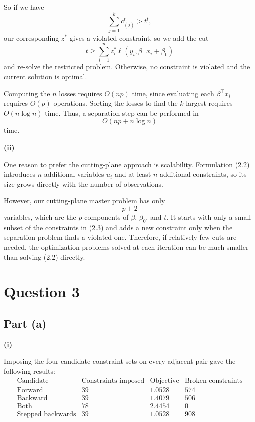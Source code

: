 \documentclass{article}
\begin{document}
So if we have
\[
\sum_{j=1}^k c_{(j)}^t>t^t,
\]
our corresponding $z^*$ gives a violated constraint, so we add the cut
\[
t
\geq
\sum_{i=1}^n
z_i^*
\ell(y_i,\beta^\top x_i+\beta_0)
\]
and re-solve the restricted problem. Otherwise, no constraint is
violated and the current solution is optimal.

Computing the $n$ losses requires $O(np)$ time, since evaluating each
$\beta^\top x_i$ requires $O(p)$ operations. Sorting the losses to find
the $k$ largest requires $O(n\log n)$ time. Thus, a separation step can
be performed in
\[
\boxed{O(np+n\log n)}
\]
time.

\textbf{(ii)}

One reason to prefer the cutting-plane approach is scalability.
Formulation (2.2) introduces $n$ additional variables $u_i$ and at least
$n$ additional constraints, so its size grows directly with the number
of observations.

However, our cutting-plane master problem has only
\[
p+2
\]
variables, which are the $p$ components of $\beta$, $\beta_0$, and $t$. It starts
with only a small subset of the constraints in (2.3) and adds a new
constraint only when the separation problem finds a violated one.
Therefore, if relatively few cuts are needed, the optimization problems
solved at each iteration can be much smaller than solving (2.2)
directly.


\vspace{8mm}

\section*{Question 3}


\subsection*{Part (a)}

\textbf{(i)}

Imposing the four candidate constraint sets on every adjacent pair gave
the following results:
\[
\begin{array}{c|c|c|c}
\text{Candidate}
& \text{Constraints imposed}
& \text{Objective}
& \text{Broken constraints}\\
\hline
\text{Forward} & 39 & 1.0528 & 574\\
\text{Backward} & 39 & 1.4079 & 506\\
\text{Both} & 78 & 2.4454 & 0\\
\text{Stepped backwards} & 39 & 1.0528 & 908
\end{array}
\]
\end{document}
